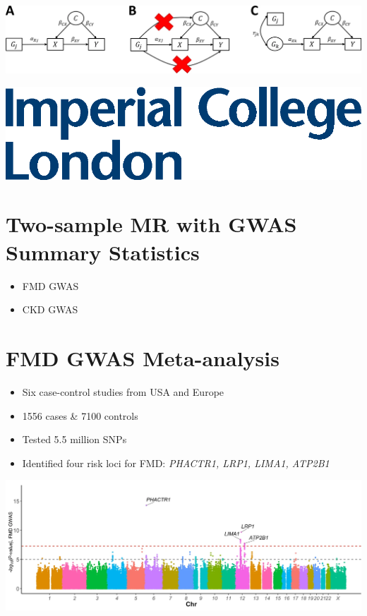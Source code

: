 {%
    \includegraphics[width=\textwidth]{mr.png} %
    \cite{de2022understanding}




\vfill

\includegraphics[width=\textwidth]{img/logo}\\

}{
\section{Two-sample MR with GWAS Summary Statistics}
\begin{itemize}
\item FMD GWAS \cite{georges2021genetic}
\item CKD GWAS \cite{neale_lab_gwas}
\end{itemize}


\section{FMD GWAS Meta-analysis \cite{georges2021genetic}}
\begin{itemize}
\item Six case-control studies from USA and Europe  
\item 1556 cases \& 7100 controls  
\item Tested 5.5 million SNPs  
\item Identified four risk loci for FMD: \textit{PHACTR1, LRP1, LIMA1, ATP2B1}  
\end{itemize}
\includegraphics[width=\textwidth]{georges2021-Fig1.png} 




}

